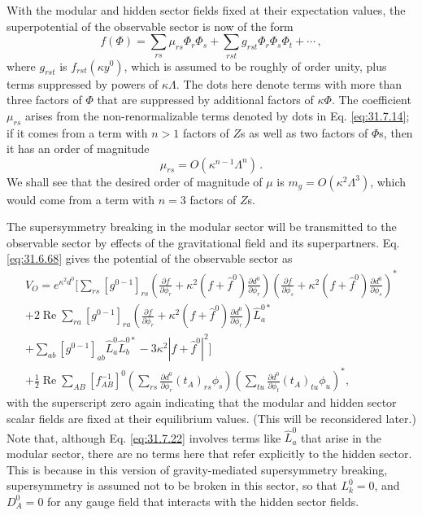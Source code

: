 With the modular and hidden sector fields fixed at their expectation values,
the superpotential of the observable sector is now of the form
\begin{equation}
  f(\Phi)
  =\sum_{rs}\mu_{rs}\Phi_r\Phi_s
   +\sum_{rst}g_{rst}\Phi_r\Phi_s\Phi_t+\cdots\,,
  \tag{31.7.20}\label{eq:31.7.20}
\end{equation}
where \(g_{rst}\) is \(f_{rst}(\kappa y^0)\), which is assumed to be roughly
of order unity, plus terms suppressed by powers of \(\kappa\Lambda\). The
dots here denote terms with more than three factors of \(\Phi\) that are
suppressed by additional factors of \(\kappa\Phi\). The coefficient
\(\mu_{rs}\) arises from the non-renormalizable terms denoted by dots in
Eq. \eqref{eq:31.7.14}; if it comes from a term with \(n>1\) factors of
\(Z\)s as well as two factors of \(\Phi\)s, then it has an order of
magnitude
\begin{equation}
  \mu_{rs}=O(\kappa^{n-1}\Lambda^n)\,.
  \tag{31.7.21}\label{eq:31.7.21}
\end{equation}
We shall see that the desired order of magnitude of \(\mu\) is
\(m_g=O(\kappa^2\Lambda^3)\), which would come from a term with \(n=3\)
factors of \(Z\)s.

The supersymmetry breaking in the modular sector will be transmitted to the
observable sector by effects of the gravitational field and its
superpartners. Eq. \eqref{eq:31.6.68} gives the potential of the observable
sector as
\begin{multline}
  V_O=e^{\kappa^2d^0}\Biggl[
  \sum_{rs}[g^{0-1}]_{rs}
  \left(
    \frac{\partial f}{\partial\phi_r}
    +\kappa^2(f+\widehat f^0)\frac{\partial d^0}{\partial\phi_r}
  \right)
  \left(
    \frac{\partial f}{\partial\phi_s}
    +\kappa^2(f+\widehat f^0)\frac{\partial d^0}{\partial\phi_s}
  \right)^*
  \\
  +2\operatorname{Re}\sum_{ra}[g^{0-1}]_{ra}
  \left(
    \frac{\partial f}{\partial\phi_r}
    +\kappa^2(f+\widehat f^0)\frac{\partial d^0}{\partial\phi_r}
  \right)\widehat L_a^{0*}
  \\
  +\sum_{ab}[g^{0-1}]_{ab}\widehat L_a^0\widehat L_b^{0*}
  -3\kappa^2|f+\widehat f^0|^2
  \Biggr]
  \\
  +\frac12\operatorname{Re}\sum_{AB}[f_{AB}^{-1}]^0
  \left(
    \sum_{rs}\frac{\partial d^0}{\partial\phi_r}
      (t_A)_{rs}\phi_s
  \right)
  \left(
    \sum_{tu}\frac{\partial d^0}{\partial\phi_t}
      (t_A)_{tu}\phi_u
  \right)^*,
  \tag{31.7.22}\label{eq:31.7.22}
\end{multline}
with the superscript zero again indicating that the modular and hidden
sector scalar fields are fixed at their equilibrium values. (This will be
reconsidered later.) Note that, although Eq. \eqref{eq:31.7.22} involves
terms like \(\widehat L_a^0\) that arise in the modular sector, there are no
terms here that refer explicitly to the hidden sector. This is because in
this version of gravity-mediated supersymmetry breaking, supersymmetry is
assumed not to be broken in this sector, so that \(L_k^0=0\), and
\(D_A^0=0\) for any gauge field that interacts with the hidden sector
fields.

